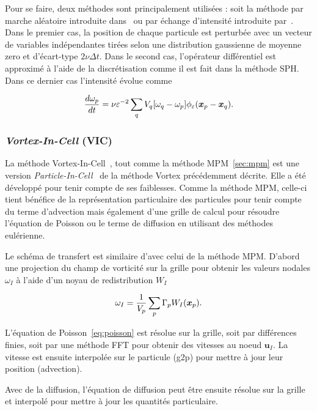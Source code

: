 Pour se faire, deux méthodes sont principalement utilisées : soit la méthode par marche aléatoire introduite dans~\cite{chorin_discretization_1973} ou par échange d'intensité introduite par~\cite{1989MaCom..53..485D}.
Dans le premier cas, la position de chaque particule est perturbée avec un vecteur de variables indépendantes tirées selon une distribution gaussienne de moyenne zero et d'écart-type $2\nu \Delta t$. Dans le second cas, l'opérateur différentiel est approximé à l'aide de la discrétisation comme il est fait dans la méthode SPH. Dans ce dernier cas l'intensité évolue comme

\begin{equation*}
    \frac{d \omega_p}{dt} = \nu \varepsilon^{-2} \sum_q V_q [\omega_q - \omega_p] \phi_\varepsilon(\bm{x}_p - \bm{x}_q).
\end{equation*}

\subsubsection{\textit{Vortex-In-Cell} (VIC)}

La méthode Vortex-In-Cell~\cite{christiansen_1973}, tout comme la méthode MPM~\ref{sec:mpm} est une version \textit{Particle-In-Cell}~\cite{birdsall_1969} de la méthode Vortex précédemment décrite. Elle a été développé pour tenir compte de ses faiblesses. Comme la méthode MPM, celle-ci tient bénéfice de la représentation particulaire des particules pour tenir compte du terme d'advection mais également d'une grille de calcul pour résoudre l'équation de Poisson ou le terme de diffusion en utilisant des méthodes eulérienne.

Le schéma de transfert est similaire d'avec celui de la méthode MPM. D'abord une projection du champ de vorticité sur la grille pour obtenir les valeurs nodales $\omega_I$ à l'aide d'un noyau de redistribution $W_I$

\begin{equation*}
    \omega_I = \frac{1}{V_p}\sum_p \Gamma_p W_I(\bm{x}_p).
\end{equation*}

L'équation de Poisson~\ref{eq:poisson} est résolue sur la grille, soit par différences finies, soit par une méthode FFT pour obtenir des vitesses au noeud $\bm u_I$. La vitesse est ensuite interpolée sur le particule (g2p) pour mettre à jour leur position (advection).

Avec de la diffusion, l'équation de diffusion peut être ensuite résolue sur la grille et interpolé pour mettre à jour les quantités particulaire.

